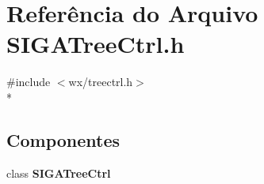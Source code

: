 \section{Referência do Arquivo S\+I\+G\+A\+Tree\+Ctrl.\+h}
\label{_s_i_g_a_tree_ctrl_8h}
{\ttfamily \#include $<$wx/treectrl.\+h$>$}\\*
\subsection*{Componentes}
\begin{DoxyCompactItemize}
\item 
class {\bf S\+I\+G\+A\+Tree\+Ctrl}
\end{DoxyCompactItemize}
